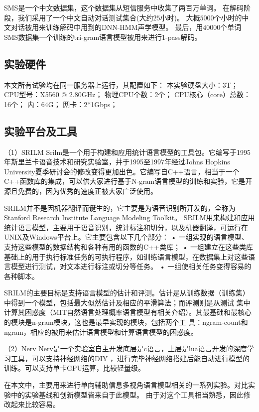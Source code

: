 SMS是一个中文数据集，这个数据集从短信服务中收集了两百万单词。
在解码阶段，我们采用了一个中文自动对话测试集合(大约$25$小时)。
大概$5000$个小时的中文对话被用来训练解码中用到的DNN-HMM声学模型。
最后，用$40000$个单词SMS数据集一个训练的tri-gram语言模型被用来进行1-pass解码。




\subsection{实验硬件}
本文所有试验均在同一服务器上运行，其配置如下：
本实验硬盘大小：3T；
CPU型号：X5560 @ 2.80GHz；
物理CPU个数：2个；
CPU核心（core）总数：16个；
内：64G；
网卡：2*1Gbps；



\subsection{实验平台及工具}

（1）SRILM
Srilm是一个用于构建和应用统计语言模型的工具包。它编写于1995年斯里兰卡语音技术和研究实验室，并于1995至1997年经过Johns Hopkins University夏季研讨会的修改变得更加出色。它编写自C++语言，相当于一个C++函数库的集成，可以供大家进行基于N-gram语言模型的训练和实验，它是开源且免费的，因为优秀的速度正被大家广泛使用\cite{stolcke2002srilm}。

SRILM并不是因机器翻译而诞生的，它主要是为语音识别所开发的，全称为Stanford Research Institute Language Modeling Toolkit。
SRILM用来构建和应用统计语言模型，主要用于语音识别，统计标注和切分，以及机器翻译，可运行在UNIX及Windows平台上。它主要包含以下几个部分：
• 一组实现的语言模型、支持这些模型的数据结构和各种有用的函数的C++类库；
• 一组建立在这些类库基础上的用于执行标准任务的可执行程序，如训练语言模型，在数据集上对这些语言模型进行测试，对文本进行标注或切分等任务。
• 一组使相关任务变得容易的各种脚本。

SRILM的主要目标是支持语言模型的估计和评测。估计是从训练数据（训练集）中得到一个模型，包括最大似然估计及相应的平滑算法；而评测则是从测试 集中计算其困惑度（MIT自然语言处理概率语言模型有相关介绍）。其最基础和最核心的模块是n-gram模块，这也是最早实现的模块，包括两个工 具：ngram-count和ngram，相应的被用来估计语言模型和计算语言模型的困惑度。


（2）Nerv
Nerv是一个实验室自主开发底层是c语言，上层是lua语言开发的深度学习工具，可以支持神经网络的DIY
，进行完毕神经网络搭建后能自动进行模型的训练。可以支持单卡GPU运算，比较轻量级。

在本文中，主要用来进行单向辅助信息多视角语言模型相关的一系列实验。对比实验中的实验基线和创新模型皆来自于此模型。
由于对这个工具相当熟悉，因此修改起来比较容易。

